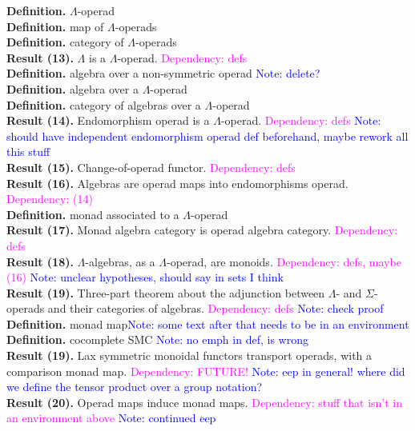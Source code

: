 \documentclass{amsart}
\begin{document}
\textbf{Definition.} $\Lambda$-operad
\\ \textbf{Definition.} map of $\Lambda$-operads
\\ \textbf{Definition.} category of $\Lambda$-operads
\\ \textbf{Result (13).} $\Lambda$ is a $\Lambda$-operad. \textcolor{magenta}{Dependency: defs}
\\ \textbf{Definition.} algebra over a non-symmetric operad \textcolor{blue}{Note: delete?}
\\ \textbf{Definition.} algebra over a $\Lambda$-operad
\\ \textbf{Definition.} category of algebras over a $\Lambda$-operad
\\ \textbf{Result (14).} Endomorphism operad is a $\Lambda$-operad. \textcolor{magenta}{Dependency: defs} \textcolor{blue}{Note: should have independent endomorphism operad def beforehand, maybe rework all this stuff}
\\ \textbf{Result (15).} Change-of-operad functor. \textcolor{magenta}{Dependency: defs}
\\ \textbf{Result (16).} Algebras are operad maps into endomorphisms operad. \textcolor{magenta}{Dependency: (14)}
\\ \textbf{Definition.} monad associated to a $\Lambda$-operad
\\ \textbf{Result (17).} Monad algebra category is operad algebra category. \textcolor{magenta}{Dependency: defs}
\\ \textbf{Result (18).} $\Lambda$-algebras, as a $\Lambda$-operad, are monoids. \textcolor{magenta}{Dependency: defs, maybe (16)} \textcolor{blue}{Note: unclear hypotheses, should say in sets I think}
\\ \textbf{Result (19).} Three-part theorem about the adjunction between $\Lambda$- and $\Sigma$-operads and their categories of algebras. \textcolor{magenta}{Dependency: defs} \textcolor{blue}{Note: check proof}
\\ \textbf{Definition.} monad map\textcolor{blue}{Note: some text after that needs to be in an environment}
\\ \textbf{Definition.} cocomplete SMC \textcolor{blue}{Note: no emph in def, is wrong}
\\ \textbf{Result (19).} Lax symmetric monoidal functors transport operads, with a comparison monad map. \textcolor{magenta}{Dependency: FUTURE!} \textcolor{blue}{Note: eep in general! where did we define the tensor product over a group notation?}
\\ \textbf{Result (20).} Operad maps induce monad maps. \textcolor{magenta}{Dependency: stuff that isn't in an environment above} \textcolor{blue}{Note: continued eep}
\end{document}

